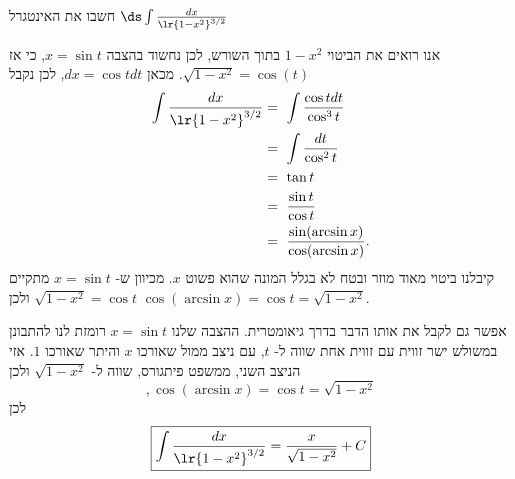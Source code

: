 חשבו את האינטגרל
$\ds \int \frac{dx}{\lr{1-x^{2}}^{3/2}}$
\begin{solbox}
אנו רואים את הביטוי
$1-x^2$
בתוך השורש, לכן נחשוד בהצבה
$x=\sin t$,
כי אז
$\sqrt{1-x^2}=\cos(t)$.
מכאן
$dx=\cos tdt$,
לכן
נקבל
\begin{align*}
    \int \frac{dx}{\lr{1-x^{2}}^{3/2}}&=\ \int \frac{\cos tdt}{\cos^3t}\\
    &=\ \int\frac{dt}{\cos^2t}\\
    &=\ \tan t\\
    &=\ \frac{\sin t}{\cos t}\\
    &=\ \frac{\sin(\arcsin x)}{\cos(\arcsin x)}.
\end{align*}
קיבלנו ביטוי מאוד מוזר ובטח לא בגלל המונה שהוא פשוט
$x$.
מכיוון ש-
$x=\sin t$
מתקיים
$\sqrt{1-x^2}=\cos t$
ולכן
$\cos(\arcsin x)=\cos t=\sqrt{1-x^2}$.

אפשר גם לקבל את אותו הדבר בדרך גיאומטרית.
ההצבה שלנו
$x=\sin t$
רומזת לנו להתבונן במשולש ישר זווית עם זווית אחת שווה ל-
$t$,
עם ניצב ממול שאורכו
$x$
והיתר שאורכו
$1$.
אזי הניצב השני, ממשפט פיתגורס, שווה ל-
$\sqrt{1-x^2}$
ולכן
$$,\cos(\arcsin x)=\cos t=\sqrt{1-x^2}$$
לכן
\begin{align*}
\boxed{\int \frac{dx}{\lr{1-x^{2}}^{3/2}}=\frac{x}{\sqrt{1-x^2}}+C}
\end{align*}
\end{solbox}
